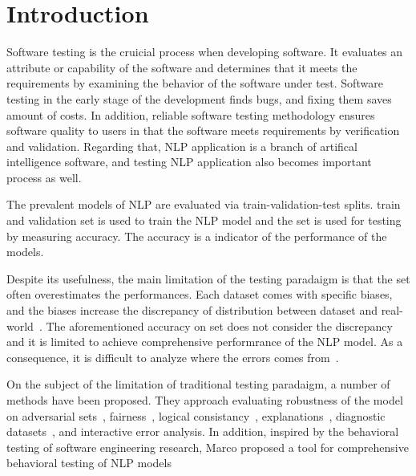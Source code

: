 \section{Introduction}
\label{sec:intro}

Software testing is the cruicial process when developing software.  It
evaluates an attribute or capability of the software and determines
that it meets the requirements by examining the behavior of the
software under test. Software testing in the early stage of the
development finds bugs, and fixing them saves amount of costs. In
addition, reliable software testing methodology ensures software
quality to users in that the software meets requirements by
verification and validation. Regarding that, NLP application is a branch
of artifical intelligence software, and testing NLP application
also becomes important process as well.

The prevalent models of NLP are evaluated via train-validation-test
splits. train and validation set is used to train the NLP model and
the \ho set is used for testing by measuring accuracy. The accuracy is
a indicator of the performance of the models.

Despite its usefulness, the main limitation of the testing paradaigm
is that the \ho set often overestimates the performances. Each dataset
comes with specific biases, and the biases increase the discrepancy of
distribution between dataset and
real-world~\cite{recht2019imagenetbias}. The aforementioned accuracy
on \ho set does not consider the discrepancy and it is limited to
achieve comprehensive performrance of the NLP model. As a consequence,
it is difficult to analyze where the errors comes
from~\cite{wu2019errudite}.

On the subject of the limitation of traditional testing paradaigm, a
number of methods have been proposed. They approach evaluating
robustness of the model on adversarial sets~\cite{}, fairness~\cite{},
logical consistancy~\cite{}, explanations~\cite{}, diagnostic
datasets~\cite{}, and interactive error analysis. In addition,
inspired by the behavioral testing of software engineering research,
Marco \etal proposed a tool for comprehensive behavioral
testing of NLP models~\cite{marcoACL2020checklist}


